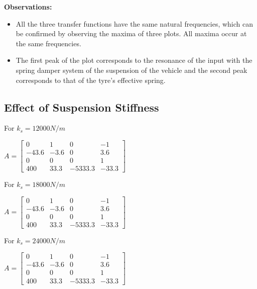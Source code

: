 \documentclass[12pt, a4paper, oneside]{report}
\begin{document}
\textbf{Observations:}
\begin{itemize}
    \item All the three transfer functions have the same natural frequencies, which can be confirmed by observing the maxima of three plots. All maxima occur at the same
    frequencies.
    \item The first peak of the plot corresponds to the resonance of the input with the spring
    damper system of the suspension of the vehicle and the second peak corresponds to that of the tyre's effective spring.
\end{itemize}

\subsection{Effect of Suspension Stiffness}


    For $k_s = 12000 N/m$ 

    $A = \begin{bmatrix}
        0 & 1 & 0 & -1 \\
        -43.6 & -3.6 & 0 & 3.6 \\
        0 & 0 & 0 & 1 \\
        400 & 33.3 & -5333.3 & -33.3
    \end{bmatrix}$\hfill \break

    For $k_s = 18000 N/m$ 

    $A = \begin{bmatrix}
        0 & 1 & 0 & -1 \\
        -43.6 & -3.6 & 0 & 3.6 \\
        0 & 0 & 0 & 1 \\
        400 & 33.3 & -5333.3 & -33.3
    \end{bmatrix}$\hfill \break

    For $k_s = 24000 N/m$ 

    $A = \begin{bmatrix}
        0 & 1 & 0 & -1 \\
        -43.6 & -3.6 & 0 & 3.6 \\
        0 & 0 & 0 & 1 \\
        400 & 33.3 & -5333.3 & -33.3
    \end{bmatrix}$\hfill \break
    
\end{document}
